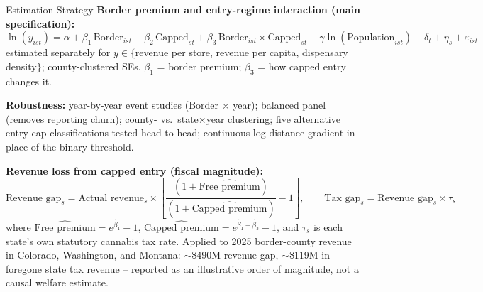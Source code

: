 \documentclass[aspectratio=169,11pt]{beamer}
\begin{document}
\begin{frame}{Estimation Strategy}
\textbf{Border premium and entry-regime interaction (main specification):}
\[
\ln(y_{ist}) = \alpha + \beta_1\,\text{Border}_{ist} + \beta_2\,\text{Capped}_{st}
+ \beta_3\,\text{Border}_{ist}\times\text{Capped}_{st} + \gamma\ln(\text{Population}_{ist})
+ \delta_t + \eta_s + \varepsilon_{ist}
\]
estimated separately for $y \in \{$revenue per store, revenue per capita, dispensary density$\}$;
county-clustered SEs. $\beta_1$ = border premium; $\beta_3$ = how capped entry changes it.

\vspace{0.3em}
\textbf{Robustness:} year-by-year event studies (Border $\times$ year); balanced panel (removes reporting
churn); county- vs.\ state$\times$year clustering; five alternative entry-cap classifications tested
head-to-head; continuous log-distance gradient in place of the binary threshold.

\vspace{0.5em}
\textbf{Revenue loss from capped entry (fiscal magnitude):}
\[
\text{Revenue gap}_s = \text{Actual revenue}_s \times \left[\frac{(1+\widehat{\text{Free premium}})}
{(1+\widehat{\text{Capped premium}})} - 1\right], \qquad
\text{Tax gap}_s = \text{Revenue gap}_s \times \tau_s
\]
where $\widehat{\text{Free premium}} = e^{\hat\beta_1}-1$, $\widehat{\text{Capped premium}} =
e^{\hat\beta_1+\hat\beta_3}-1$, and $\tau_s$ is each state's own statutory cannabis tax rate. Applied to 2025
border-county revenue in Colorado, Washington, and Montana: $\sim$\$490M revenue gap, $\sim$\$119M in foregone
state tax revenue -- reported as an illustrative order of magnitude, not a causal welfare estimate.
\end{frame}
\end{document}
